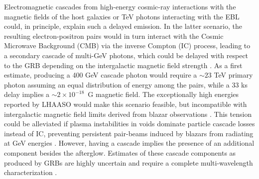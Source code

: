 \documentclass[preprint]{aastex631}
\begin{document}
Electromagnetic cascades from high-energy cosmic-ray interactions with the magnetic fields of the host galaxies or TeV photons interacting with the EBL could, in principle, explain such a delayed emission. In the latter scenario, the resulting electron-positron pairs would in turn interact with the Cosmic Microwave Background (CMB) via the inverse Compton (IC) process, leading to a secondary cascade of multi-GeV photons, which could be delayed with respect to the GRB depending on the intergalactic magnetic field strength \citep[see, e.g.][]{Neronov09}. As a first estimate, producing a 400 GeV cascade photon would require a $\sim 23$ TeV primary photon assuming an equal distribution of energy among the pairs, while a 33 ks delay implies a $\sim 2\times10^{-18}$~G magnetic field. The exceptionally high energies reported by LHAASO would make this scenario feasible, but incompatible with intergalactic magnetic field limits derived from blazar observations \citep[$B>3\times10^{-16}$~G for conservative blazar duty cycles;][]{Fermi-LATextended18}. This tension could be alleviated if plasma instabilities in voids dominate particle cascade losses instead of IC, preventing persistent pair-beams induced by blazars from radiating at GeV energies \citep{Broderick12}. However, having a cascade implies the presence of an additional component besides the afterglow. Estimates of these cascade components as produced by GRBs are highly uncertain and require a complete multi-wavelength characterization \citep{DaVela23}.

%

\end{document}
